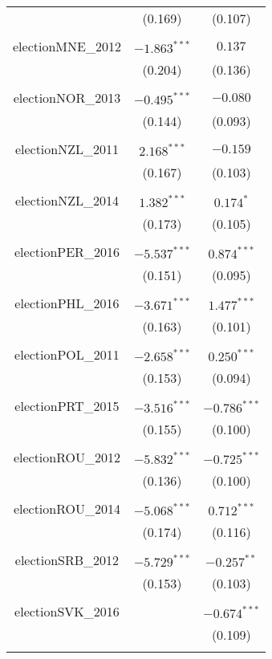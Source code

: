 \documentclass[12pt, titlepage]{article}
\begin{document}
\begin{table}[!htbp]
\begin{tabular}{@{\extracolsep{5pt}}ccc }
		& (0.169) & (0.107) \\ 
		& & \\ 
		electionMNE\_2012 & $-1.863^{***}$ & $0.137$ \\ 
		& (0.204) & (0.136) \\ 
		& & \\ 
		electionNOR\_2013 & $-0.495^{***}$ & $-0.080 $\\ 
		& (0.144) & (0.093) \\ 
		& & \\ 
		electionNZL\_2011 & $2.168^{***}$ & $-0.159$ \\ 
		& (0.167) & (0.103) \\ 
		& & \\ 
		electionNZL\_2014 & $1.382^{***}$ & $0.174^{*}$ \\ 
		& (0.173) & (0.105) \\ 
		& & \\ 
		electionPER\_2016 & $-5.537^{***}$ & $0.874^{***}$ \\ 
		& (0.151) & (0.095) \\ 
		& & \\ 
		electionPHL\_2016 & $-3.671^{***}$ & $1.477^{***}$ \\ 
		& (0.163) & (0.101) \\ 
		& & \\ 
		electionPOL\_2011 & $-2.658^{***}$ & $0.250^{***}$ \\ 
		& (0.153) & (0.094) \\ 
		& & \\ 
		electionPRT\_2015 & $-3.516^{***}$ & $-0.786^{***}$ \\ 
		& (0.155) & (0.100) \\ 
		& & \\ 
		electionROU\_2012 & $-5.832^{***}$ & $-0.725^{***}$ \\ 
		& (0.136) & (0.100) \\ 
		& & \\ 
		electionROU\_2014 & $-5.068^{***}$ & $0.712^{***}$ \\ 
		& (0.174) & (0.116) \\ 
		& & \\ 
		electionSRB\_2012 & $-5.729^{***}$ & $-0.257^{**}$ \\ 
		& (0.153) & (0.103) \\ 
		& & \\ 
		electionSVK\_2016 &  & $-0.674^{***} $\\ 
		&  & (0.109) \\ 
		& & \\ 

\end{tabular}
\end{table}
\end{document}
